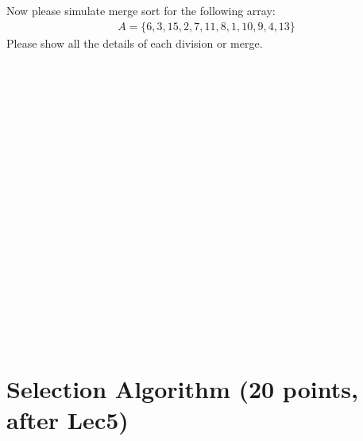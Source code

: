 \documentclass[11pt]{exam}
\begin{document}
Now please simulate merge sort for the following array:
\begin{align*}
A = \{6, 3, 15, 2, 7, 11, 8, 1, 10, 9, 4, 13\}
\end{align*}
Please show all the details of each division or merge.
\begin{solution}
~\\
~\\
~\\
~\\
~\\
~\\
~\\
~\\
~\\
~\\
~\\
~\\
~\\
~\\
~\\
~\\
~\\
~\\
\end{solution}
\section{Selection Algorithm (20 points, after Lec5)}
\end{document}
